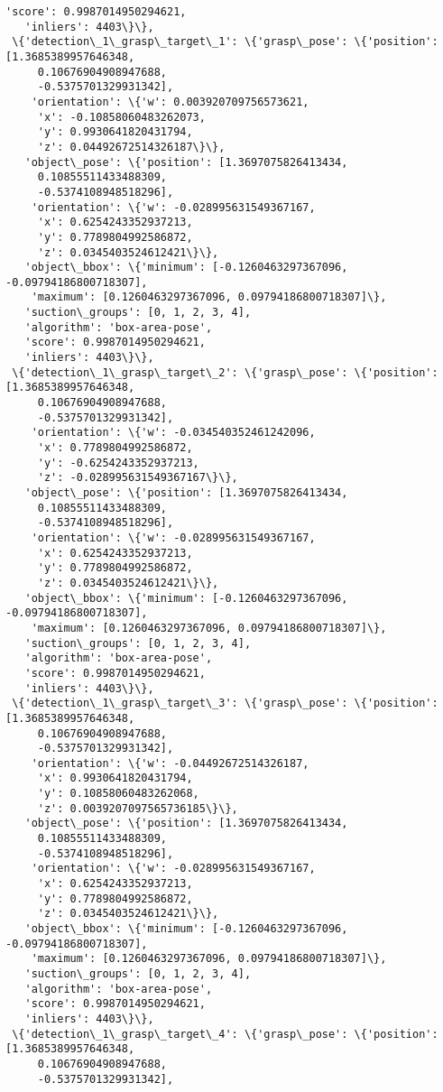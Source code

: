 \documentclass[11pt]{article}
\begin{document}
\begin{tcolorbox}[breakable, size=fbox, boxrule=.5pt, pad at break*=1mm, opacityfill=0]
\begin{Verbatim}[commandchars=\\\{\}]
   'score': 0.9987014950294621,
   'inliers': 4403\}\},
 \{'detection\_1\_grasp\_target\_1': \{'grasp\_pose': \{'position': [1.3685389957646348,
     0.10676904908947688,
     -0.5375701329931342],
    'orientation': \{'w': 0.003920709756573621,
     'x': -0.10858060483262073,
     'y': 0.9930641820431794,
     'z': 0.04492672514326187\}\},
   'object\_pose': \{'position': [1.3697075826413434,
     0.10855511433488309,
     -0.5374108948518296],
    'orientation': \{'w': -0.028995631549367167,
     'x': 0.6254243352937213,
     'y': 0.7789804992586872,
     'z': 0.0345403524612421\}\},
   'object\_bbox': \{'minimum': [-0.1260463297367096, -0.09794186800718307],
    'maximum': [0.1260463297367096, 0.09794186800718307]\},
   'suction\_groups': [0, 1, 2, 3, 4],
   'algorithm': 'box-area-pose',
   'score': 0.9987014950294621,
   'inliers': 4403\}\},
 \{'detection\_1\_grasp\_target\_2': \{'grasp\_pose': \{'position': [1.3685389957646348,
     0.10676904908947688,
     -0.5375701329931342],
    'orientation': \{'w': -0.034540352461242096,
     'x': 0.7789804992586872,
     'y': -0.6254243352937213,
     'z': -0.028995631549367167\}\},
   'object\_pose': \{'position': [1.3697075826413434,
     0.10855511433488309,
     -0.5374108948518296],
    'orientation': \{'w': -0.028995631549367167,
     'x': 0.6254243352937213,
     'y': 0.7789804992586872,
     'z': 0.0345403524612421\}\},
   'object\_bbox': \{'minimum': [-0.1260463297367096, -0.09794186800718307],
    'maximum': [0.1260463297367096, 0.09794186800718307]\},
   'suction\_groups': [0, 1, 2, 3, 4],
   'algorithm': 'box-area-pose',
   'score': 0.9987014950294621,
   'inliers': 4403\}\},
 \{'detection\_1\_grasp\_target\_3': \{'grasp\_pose': \{'position': [1.3685389957646348,
     0.10676904908947688,
     -0.5375701329931342],
    'orientation': \{'w': -0.04492672514326187,
     'x': 0.9930641820431794,
     'y': 0.10858060483262068,
     'z': 0.0039207097565736185\}\},
   'object\_pose': \{'position': [1.3697075826413434,
     0.10855511433488309,
     -0.5374108948518296],
    'orientation': \{'w': -0.028995631549367167,
     'x': 0.6254243352937213,
     'y': 0.7789804992586872,
     'z': 0.0345403524612421\}\},
   'object\_bbox': \{'minimum': [-0.1260463297367096, -0.09794186800718307],
    'maximum': [0.1260463297367096, 0.09794186800718307]\},
   'suction\_groups': [0, 1, 2, 3, 4],
   'algorithm': 'box-area-pose',
   'score': 0.9987014950294621,
   'inliers': 4403\}\},
 \{'detection\_1\_grasp\_target\_4': \{'grasp\_pose': \{'position': [1.3685389957646348,
     0.10676904908947688,
     -0.5375701329931342],

\end{Verbatim}
\end{tcolorbox}
\end{document}
